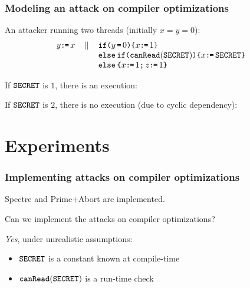 \documentclass[aspectratio=169]{beamer}
\begin{document}
\begin{frame}
  \frametitle{Modeling an attack on compiler optimizations}

  An attacker running two threads (initially $x=y=0$):
\[\begin{array}[t]{lcl}
  y\GETS x
  & \PAR
  & \begin{array}[t]{@{}l}
    \IF{y\EQ0}\THEN x\GETS1
    \brELIF{\CANREAD(\SEC)}\THEN x\GETS\SEC
    \brELSE x\GETS1\SEMI z\GETS1 \FI
\end{array}\end{array}\]

If $\texttt{SECRET}$ is $1$, there is an execution:
\begin{tikzdisplay}[node distance=1em]
\end{tikzdisplay}

If $\texttt{SECRET}$ is $2$, there is no execution (due to cyclic dependency):
\begin{tikzdisplay}[node distance=1em]
\end{tikzdisplay}

\end{frame}

\section{Experiments}
\begin{frame}
  \frametitle{Implementing attacks on compiler optimizations}

  Spectre and Prime+Abort are implemented.

  \bigskip
  Can we implement the attacks on compiler optimizations?

  \pause\bigskip
  \emph{Yes}\pause, under unrealistic assumptions:
  \begin{itemize}
  \item $\texttt{SECRET}$ is a constant known at compile-time
  \item $\texttt{canRead}(\texttt{SECRET})$ is a run-time check
  \end{itemize}

\end{frame}
\end{document}
